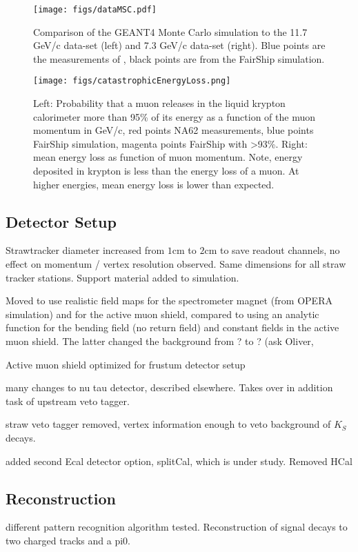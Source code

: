 \begin{figure}[htb]
\begin{center}
\texttt{[image: figs/dataMSC.pdf]}
\caption{ Comparison of the GEANT4 Monte Carlo simulation to the 11.7 GeV/c data-set (left) and 7.3 GeV/c data-set (right). Blue points are the measurements of \cite{Akimenko:1984qw}, black points are from the FairShip simulation. }
\label{fig:data}
\end{center}
\end{figure}

\begin{figure}[htb]
\begin{center}
\texttt{[image: figs/catastrophicEnergyLoss.png]}
\caption{ Left: Probability that a muon releases in the liquid krypton calorimeter more than 95\% of its energy as a function of the muon momentum in GeV/c, red points NA62 measurements, blue points FairShip simulation, magenta points FairShip with >93\%.
Right: mean energy loss as function of muon momentum. Note, energy deposited in krypton is less than the energy loss of a muon. At higher energies, mean energy loss is lower than expected.}
\label{fig:data}
\end{center}
\end{figure}

\subsection{Detector Setup}
\label{sec:detectors}
Strawtracker diameter increased from $1$cm to $2$cm to save readout channels, no effect on momentum / vertex resolution observed.
Same dimensions for all straw tracker stations. Support material added to simulation.

Moved to use realistic field maps for the spectrometer magnet (from OPERA simulation) and for the active muon shield, compared to using an analytic function for the bending field (no return field) and constant fields in the active muon shield. The latter changed the background from ? to ? (ask Oliver,

Active muon shield optimized for frustum detector setup

many changes to nu tau detector, described elsewhere. Takes over in addition task of upstream veto tagger.

straw veto tagger removed, vertex information enough to veto background of $K_S$ decays.

added second Ecal detector option, splitCal, which is under study. Removed HCal



\subsection{Reconstruction}
\label{sec:reconstruction}
different pattern recognition algorithm tested. Reconstruction of signal decays to two charged tracks and a pi0.



